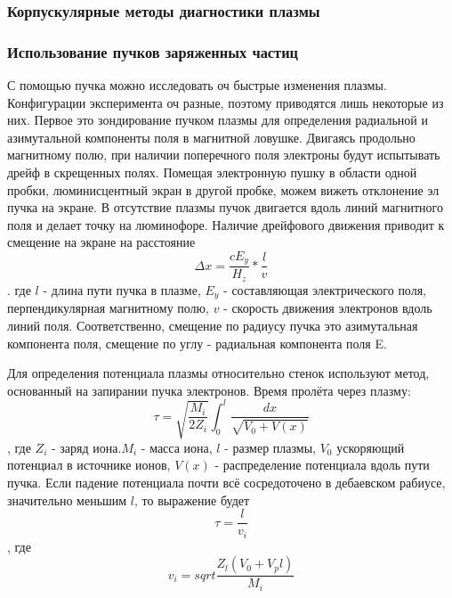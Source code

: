 \documentclass[10pt, a4paper]{article}
\numberwithin{equation}{section}
\begin{document}
\subsubsection{Корпускулярные методы диагностики плазмы}
\label{11.6}

\subsubsection{Использование пучков заряженных частиц}
\label{11.6.1}
С помощью пучка можно исследовать оч быстрые изменения плазмы. Конфигурации эксперимента оч разные, поэтому приводятся лишь некоторые из них.
Первое это зондирование пучком плазмы для определения радиальной и азимутальной компоненты поля в магнитной ловушке. Двигаясь продольно магнитному полю, при наличии поперечного поля электроны будут испытывать дрейф в скрещенных полях. Помещая электронную пушку в области одной пробки, люминисцентный экран в другой пробке, можем вижеть отклонение эл пучка на экране.
В отсутствие плазмы пучок двигается вдоль линий магнитного поля и делает точку на люминофоре. Наличие дрейфового движения приводит к смещение на экране на расстояние
\begin{equation}
	\Delta x=\frac{cE_y}{H_z} * \frac{l}{v}
\end{equation}
. где $l$ - длина пути пучка в плазме, $E_y$ - составляющая электрического поля, перпендикулярная магнитному полю, $v$ - скорость движения электронов вдоль линий поля.
Соответственно, смещение по радиусу пучка это азимутальная компонента поля, смещение по углу - радиальная компонента поля E.

Для определения потенциала плазмы относительно стенок используют метод, основанный на запирании пучка электронов. Время пролёта через плазму:
\begin{equation}
	\tau = \sqrt{\frac{M_i}{2Z_i}} \int_{0}^{l} \frac{dx}{\sqrt{V_0 +V(x)}}
\end{equation}
, где $Z_i$ - заряд иона.$M_i$ - масса иона, $l$ - размер плазмы, $V_0$ ускоряющий потенциал в источнике ионов, $V(x)$ - распределение потенциала вдоль пути пучка.
Если падение потенциала почти всё сосредоточено в дебаевском рабиусе, значительно меньшим $l$, то выражение будет
\begin{equation}
	\tau = \frac{l}{v_i}
\end{equation}
, где 
\begin{equation}
   v_i= sqrt{\frac{Z_l (V_0 + V_pl)}{M_i}}
\end{equation}
\end{document}
